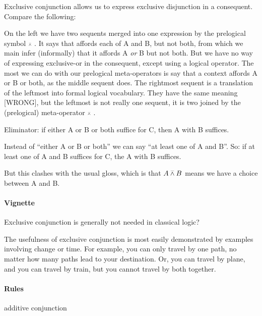 \documentclass{article}
\begin{document}
Exclusive conjunction allows us to express exclusive disjunction in a
consequent. Compare the following:


On the left we have two sequents merged into one expression by the
prelogical symbol \(\scriptscriptstyle\barwedge\ \). It says that \ContextG affords each of
A and B, but not both, from which we main infer (informally) that it
affords A \textit{or} B but not both. But we have no way of expressing
exclusive-or in the consequent, except using a logical operator. The
most we can do with our prelogical meta-operators is say that a
context affords A or B or both, as the middle sequent does. The
rightmost sequent is a translation of the leftmost into formal logical
vocabulary. They have the same meaning [WRONG], but the leftmost is
not really one sequent, it is two joined by the (prelogical)
meta-operator \(\scriptscriptstyle\barwedge\ \).

Eliminator: if either A or B or both suffice for C, then A with B
suffices.

Instead of ``either A or B or both'' we can say ``at least one of A
and B''. So: if at least one of A and B suffices for C, the A with B
suffices.

But this clashes with the usual gloss, which is that \(A\barwedge B\) means we have a choice between A and B.

\paragraph{Vignette\\}

Exclusive conjunction is generally not needed in classical logic?

The usefulness of exclusive conjunction is most easily demonstrated by
examples involving change or time. For example, you can only travel by
one path, no matter how many paths lead to your destination. Or, you
can travel by plane, and you can travel by train, but you cannot
travel by both together.

\paragraph{Rules} additive conjunction
\end{document}
